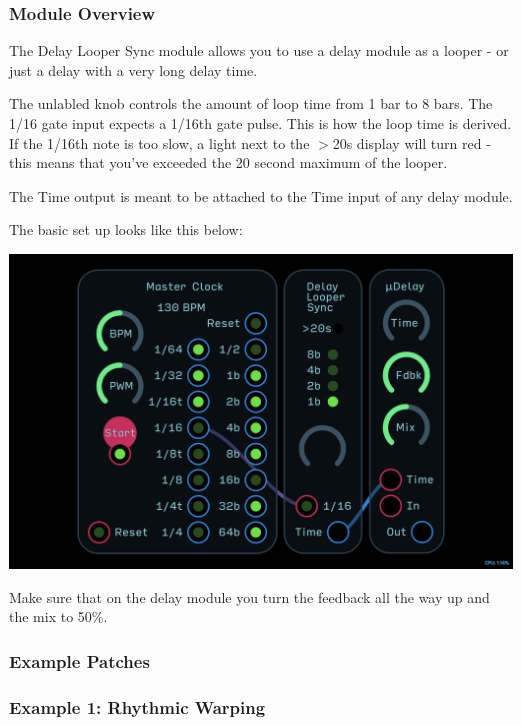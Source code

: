 \documentclass[11pt]{book}
\begin{document}
\begin{multicols*}{2}

\subsubsection*{Module Overview}

The Delay Looper Sync module allows you to use a delay module as a looper - or just a delay with a very long delay time.

The unlabled knob controls the amount of loop time from 1 bar to 8 bars. The 1/16 gate input expects a 1/16th gate pulse. This is how the loop time is derived. If the 1/16th note is too slow, a light next to the $>$20s display will turn red - this means that you've exceeded the 20 second maximum of the looper.

The Time output is meant to be attached to the Time input of any delay module.

The basic set up looks like this below:

\begin{center}
\includegraphics[width=0.95\linewidth]{delay-looper-sync-fig1.png}
\end{center}

Make sure that on the delay module you turn the feedback all the way up and the mix to 50\%. 

\subsubsection*{Example Patches}

\subsubsection*{Example 1: Rhythmic Warping}


\end{multicols*}
\end{document}
